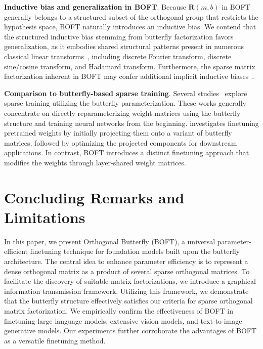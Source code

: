 \textbf{Inductive bias and generalization in BOFT}. Because $\bm{R}(m,b)$ in BOFT generally belongs to a structured subset of the orthogonal group that restricts the hypothesis space, BOFT naturally introduces an inductive bias. We contend that the structured inductive bias stemming from butterfly factorization favors generalization, as it embodies shared structural patterns present in numerous classical linear transforms~\cite{dao2019kaleidoscope}, including discrete Fourier transform, discrete sine/cosine transform, and Hadamard transform. Furthermore, the sparse matrix factorization inherent in BOFT may confer additional implicit inductive biases~\cite{gunasekar2017implicit,li2018algorithmic,liu2019neural}.

\textbf{Comparison to butterfly-based sparse training}. Several studies~\cite{dao2019learning,dao2019kaleidoscope,chen2022pixelated,dao2022monarch} explore sparse training utilizing the butterfly parameterization. These works generally concentrate on directly reparameterizing weight matrices using the butterfly structure and training neural networks from the beginning. \cite{dao2022monarch} investigates finetuning pretrained weights by initially projecting them onto a variant of butterfly matrices, followed by optimizing the projected components for downstream applications. In contrast, BOFT introduces a distinct finetuning approach that modifies the weights through layer-shared weight matrices.



\section{Concluding Remarks and Limitations}

In this paper, we present Orthogonal Butterfly (BOFT), a universal parameter-efficient finetuning technique for foundation models built upon the butterfly architecture. The central idea to enhance parameter efficiency is to represent a dense orthogonal matrix as a product of several sparse orthogonal matrices. To facilitate the discovery of suitable matrix factorizations, we introduce a graphical information transmission framework. Utilizing this framework, we demonstrate that the butterfly structure effectively satisfies our criteria for sparse orthogonal matrix factorization. We empirically confirm the effectiveness of BOFT in finetuning large language models, extensive vision models, and text-to-image generative models. Our experiments further corroborate the advantages of BOFT as a versatile finetuning method.

